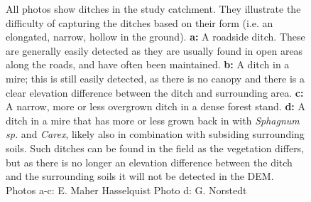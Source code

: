 \documentclass[]{interact}
\theoremstyle{plain}%
\theoremstyle{definition}
\theoremstyle{remark}
\begin{document}
\begin{figure} [!htb]
    \caption{All photos show ditches in the study catchment. They illustrate the difficulty of capturing the ditches based on their form (i.e. an elongated, narrow, hollow in the ground). \textbf{a: }A roadside ditch. These are generally easily detected as they are usually found in open areas along the roads, and have often been maintained. \textbf{b: }A ditch in a mire; this is still easily detected, as there is no canopy and there is a clear elevation difference between the ditch and surrounding area. \textbf{c: }A narrow, more or less  overgrown ditch in a dense forest stand. \textbf{d: }A ditch in a mire that has more or less grown back in with \textit{Sphagnum sp.} and \textit{Carex}, likely also in combination with subsiding surrounding soils. Such ditches can be found in the field as the vegetation differs, but as there is no longer an elevation difference between the ditch and the surrounding soils it will not be detected in the DEM. Photos a-c: E. Maher Hasselquist  Photo d: G. Norstedt}
    \label{fig:ditchpictures}
\end{figure}
\end{document}
